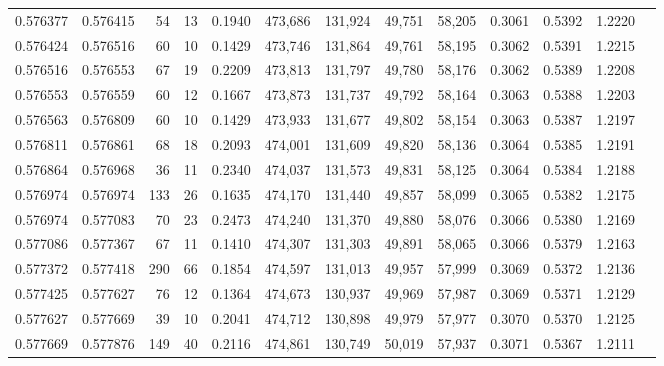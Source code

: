 \begin{tabular}{rrrrrrrrrrrrr}
0.576377 & 0.576415 &    54 &  13 &                                     0.1940 & 473,686 & 131,924 &  49,751 &  58,205 & 0.3061 & 0.5392 & 1.2220 \\
0.576424 & 0.576516 &    60 &  10 &                                     0.1429 & 473,746 & 131,864 &  49,761 &  58,195 & 0.3062 & 0.5391 & 1.2215 \\
0.576516 & 0.576553 &    67 &  19 &                                     0.2209 & 473,813 & 131,797 &  49,780 &  58,176 & 0.3062 & 0.5389 & 1.2208 \\
0.576553 & 0.576559 &    60 &  12 &                                     0.1667 & 473,873 & 131,737 &  49,792 &  58,164 & 0.3063 & 0.5388 & 1.2203 \\
0.576563 & 0.576809 &    60 &  10 &                                     0.1429 & 473,933 & 131,677 &  49,802 &  58,154 & 0.3063 & 0.5387 & 1.2197 \\
0.576811 & 0.576861 &    68 &  18 &                                     0.2093 & 474,001 & 131,609 &  49,820 &  58,136 & 0.3064 & 0.5385 & 1.2191 \\
0.576864 & 0.576968 &    36 &  11 &                                     0.2340 & 474,037 & 131,573 &  49,831 &  58,125 & 0.3064 & 0.5384 & 1.2188 \\
0.576974 & 0.576974 &   133 &  26 &                                     0.1635 & 474,170 & 131,440 &  49,857 &  58,099 & 0.3065 & 0.5382 & 1.2175 \\
0.576974 & 0.577083 &    70 &  23 &                                     0.2473 & 474,240 & 131,370 &  49,880 &  58,076 & 0.3066 & 0.5380 & 1.2169 \\
0.577086 & 0.577367 &    67 &  11 &                                     0.1410 & 474,307 & 131,303 &  49,891 &  58,065 & 0.3066 & 0.5379 & 1.2163 \\
0.577372 & 0.577418 &   290 &  66 &                                     0.1854 & 474,597 & 131,013 &  49,957 &  57,999 & 0.3069 & 0.5372 & 1.2136 \\
0.577425 & 0.577627 &    76 &  12 &                                     0.1364 & 474,673 & 130,937 &  49,969 &  57,987 & 0.3069 & 0.5371 & 1.2129 \\
0.577627 & 0.577669 &    39 &  10 &                                     0.2041 & 474,712 & 130,898 &  49,979 &  57,977 & 0.3070 & 0.5370 & 1.2125 \\
0.577669 & 0.577876 &   149 &  40 &                                     0.2116 & 474,861 & 130,749 &  50,019 &  57,937 & 0.3071 & 0.5367 & 1.2111 \\

\end{tabular}
